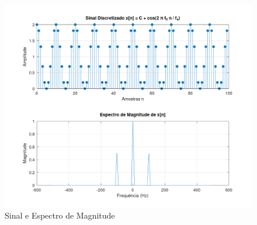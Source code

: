 
\begin{figure}[H]
   \centering
   \includegraphics[width=1\linewidth]{02_analytic_development/example_fft.png}
   \caption{Sinal e Espectro de Magnitude}
   \label{fig:enter-label}
\end{figure}
